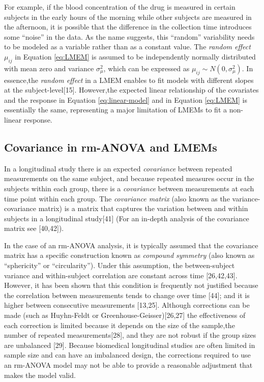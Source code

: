 \documentclass[
]{article}
\begin{document}
For example, if the blood concentration of the drug is measured in certain subjects in the early hours of the morning while other subjects are measured in the afternoon, it is possible that the difference in the collection time introduces some ``noise'' in the data. As the name suggests, this ``random'' variability needs to be modeled as a variable rather than as a constant value. The \emph{random effect} \(\mu_{ij}\) in Equation \eqref{eq:LMEM} is assumed to be independently normally distributed with mean zero and variance \(\sigma^2_\mu\), which can be expressed as \(\mu_{ij} \sim N(0,\sigma^2_\mu)\). In essence,the \emph{random effect} in a LMEM enables to fit models with different slopes at the subject-level{[}15{]}. However,the expected linear relationship of the covariates and the response in Equation \eqref{eq:linear-model} and in Equation \eqref{eq:LMEM} is essentially the same, representing a major limitation of LMEMs to fit a non-linear response.

\hypertarget{covariance-in-rm-anova-and-lmems}{%
\subsection{Covariance in rm-ANOVA and LMEMs}\label{covariance-in-rm-anova-and-lmems}}

In a longitudinal study there is an expected \emph{covariance} between repeated measurements on the same subject, and because repeated measures occur in the subjects within each group, there is a \emph{covariance} between measurements at each time point within each group. The \emph{covariance matrix} (also known as the variance-covariance matrix) is a matrix that captures the variation between and within subjects in a longitudinal study{[}41{]} (For an in-depth analysis of the covariance matrix see {[}40,42{]}).

In the case of an rm-ANOVA analysis, it is typically assumed that the covariance matrix has a specific construction known as \emph{compound symmetry} (also known as ``sphericity'' or ``circularity''). Under this assumption, the between-subject variance and within-subject correlation are constant across time {[}26,42,43{]}. However, it has been shown that this condition is frequently not justified because the correlation between measurements tends to change over time {[}44{]}; and it is higher between consecutive measurements {[}13,25{]}. Although corrections can be made (such as Huyhn-Feldt or Greenhouse-Geisser){[}26,27{]} the effectiveness of each correction is limited because it depends on the size of the sample,the number of repeated measurements{[}28{]}, and they are not robust if the group sizes are unbalanced {[}29{]}. Because biomedical longitudinal studies are often limited in sample size and can have an imbalanced design, the corrections required to use an rm-ANOVA model may not be able to provide a reasonable adjustment that makes the model valid.
\end{document}
